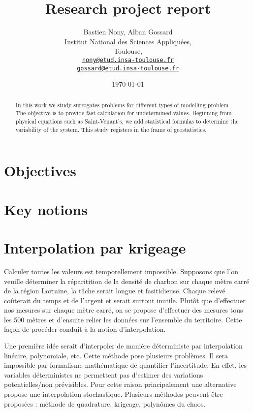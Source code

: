 \documentclass[hidelinks,12pt]{article}
\begin{document}
\title{Research project report}
\author{Bastien Nony, Alban Gossard\\
Institut National des Sciences Appliquées,\\
Toulouse,\\
\href{mailto:nony@etud.insa-toulouse.fr}{   \texttt{nony@etud.insa-toulouse.fr}}\\
\href{mailto:gossard@etud.insa-toulouse.fr}{   \texttt{gossard@etud.insa-toulouse.fr}}}
\date{\today}

\maketitle

\begin{abstract}
In this work we study surrogates problems for different types of modelling problem. The objective is to provide fast calculation for undetermined values. Beginning from physical equations such as Saint-Venant's, we add statistical formulas to determine the variability of the system. This study registers in the frame of geostatistics.
\end{abstract}

\newpage

\tableofcontents



\section{Objectives}
\section{Key notions}


\section{Interpolation par krigeage}

Calculer toutes les valeurs est temporellement impossible. Supposons que l'on veuille déterminer la réparitition de la densité de charbon sur chaque mètre carré de la région Lorraine, la tâche serait longue et fasitidieuse. Chaque relevé coûterait du temps et de l'argent et serait surtout inutile. Plutôt que d'effectuer nos mesures sur chaque mètre carré, on se propose d'effectuer des mesures tous les 500 mètres et d'ensuite relier les données sur l'ensemble du territoire. Cette façon de procéder conduit à la notion d'interpolation.

Une première idée serait d'interpoler de manière déterministe par interpolation linéaire, polynomiale, etc. Cette méthode pose plusieurs problèmes. Il sera impossible par formalisme mathématique de quantifier l'incertitude. En effet, les variables déterministes ne permettent pas d'estimer des variations potentielles/non prévisibles. Pour cette raison principalement une alternative propose une interpolation stochastique. Plusieurs méthodes peuvent être proposées : méthode de quadrature, krigeage, polynômes du chaos.
\end{document}
